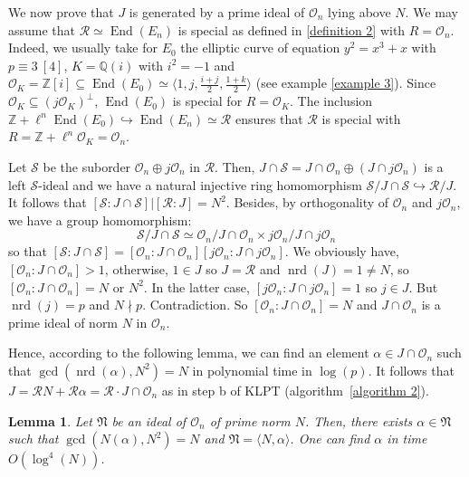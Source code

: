 \documentclass[a4paper,10pt]{report}
\theoremstyle{definition}
\theoremstyle{plain}
\newtheorem{lemma}[definition]{Lemma}
\theoremstyle{definition}
\newcommand{\Z}{\mathbb{Z}}
\newcommand{\Q}{\mathbb{Q}}
\newcommand{\m}[1]{\mathcal{#1}}
\newcommand{\mO}{\mathcal{O}}
\renewcommand{\(}{\left(}
\renewcommand{\)}{\right)}
\newcommand{\mf}[1]{\mathfrak{#1}}
\DeclareMathOperator{\End}{End}
\DeclareMathOperator{\nrd}{nrd}
\begin{document}
We now prove that $J$ is generated by a prime ideal of $\mO_n$ lying above $N$. We may assume that $\m{R}\simeq\End(E_n)$ is special as defined in \ref{definition 2} with $R=\mO_n$. Indeed,  we usually take for $E_0$ the elliptic curve of equation $y^2=x^3+x$ with $p\equiv 3 \ [4]$, $K=\Q(i)$ with $i^2=-1$ and $\mO_K=\Z[i]\subseteq \End(E_0)\simeq \langle 1,j, \frac{i+j}{2},\frac{1+k}{2}\rangle$ (see example \ref{example 3}). Since $\mO_K\subseteq (j\mO_K)^\bot$, $\End(E_0)$ is special for $R=\mO_K$. The inclusion $\Z+\ell^n\End(E_0)\hookrightarrow \End(E_n)\simeq \m{R}$ ensures that $\m{R}$ is special with $R=\Z+\ell^n\mO_K=\mO_n$.

Let $\m{S}$ be the suborder $\mO_n\oplus j\mO_n$ in $\m{R}$. Then, $J\cap\m{S}=J\cap\mO_n\oplus(J\cap j\mO_n)$ is a left $\m{S}$-ideal and we have a natural injective ring homomorphism $\m{S}/J\cap\m{S}\hookrightarrow \m{R}/J$. It follows that $[\m{S}:J\cap\m{S}]|[\m{R}:J]=N^2$. Besides, by orthogonality of $\mO_n$ and $j\mO_n$, we have a group homomorphism: 
\[\m{S}/J\cap\m{S}\simeq \mO_n/J\cap\mO_n\times j\mO_n/J\cap j\mO_n\]
so that $[\m{S}:J\cap\m{S}]=[\mO_n:J\cap\mO_n][j\mO_n:J\cap j\mO_n]$. We obviously have, $[\mO_n:J\cap\mO_n]>1$, otherwise, $1\in J$ so $J=\m{R}$ and $\nrd(J)=1\neq N$, so $[\mO_n:J\cap\mO_n]=N$ or $N^2$. In the latter case, $[j\mO_n:J\cap j\mO_n]=1$ so $j\in J$. But $\nrd(j)=p$ and $N\nmid p$. Contradiction.  So $[\mO_n:J\cap\mO_n]=N$ and $J\cap\mO_n$ is a prime ideal of norm $N$ in $\mO_n$.

Hence, according to the following lemma, we can find an element $\alpha\in J\cap \mO_n$ such that $\gcd(\nrd(\alpha),N^2)=N$ in polynomial time in $\log(p)$.  It follows that $J=\m{R}N+\m{R}\alpha=\m{R}\cdot J\cap\mO_n$ as in step b of KLPT (algorithm~\ref{algorithm 2}).

\begin{lemma}
Let $\mf{N}$ be an ideal of $\mO_n$ of prime norm $N$. Then, there exists $\alpha\in \mf{N}$ such that $\gcd(N(\alpha),N^2)=N$ and $\mf{N}=\langle N,\alpha\rangle$. One can find $\alpha$ in time $O(\log^4(N))$.
\end{lemma}
\end{document}
